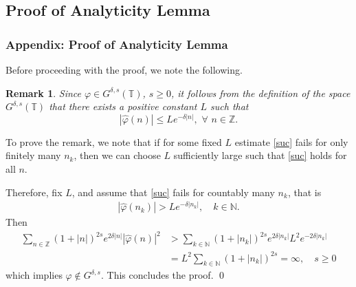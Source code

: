 \documentclass{beamer}
\numberwithin{equation}{section}
\newcommand{\vp}{\varphi}
\newtheorem{remark}{Remark}
\begin{document}
\subsection{Proof of Analyticity Lemma} 
\label{ssec:anal-strip}
\begin{frame}
  \frametitle{Appendix: Proof of Analyticity Lemma}
%
%
  Before proceeding with the proof, we note the following.
  \begin{remark}
Since $\varphi \in G^{\delta,s}(\mathbb{T})$, $s \ge 0$, it follows from the definition of the space $G^{\delta,s}(\mathbb{T})$ that there exists a positive
constant $L$ such that 
\begin{equation}
  \label{suc}
|\hat{\varphi}(n)|\le Le^{-\delta |n|},\,\,\forall\,\,n\in \mathbb{Z}.
\end{equation} 
\end{remark}
To prove the remark, we note that if for some fixed $L$ estimate \eqref{suc} fails
for only finitely many $n_{k}$, then we can choose $L$ sufficiently large such
that \eqref{suc} holds for all $n$. 
\end{frame}
\begin{frame}
  Therefore, fix $L$, and assume that \eqref{suc} fails
for countably many $n_{k}$, that is
%
%
\begin{equation*}
\begin{split}
  |\hat{\varphi}(n_{k})| > Le^{-\delta |n_{k}|}, \quad k \in \mathbb{N}.
\end{split}
\end{equation*}
%
%
%
Then
\begin{equation*}
\begin{split}
 \sum_{n\in \mathbb{Z}} 
 (1+ |n|)^{2s}e^{2\delta|n|}|\widehat{\vp}(n)|^2
 & > \sum_{k \in \mathbb{N}} 
(1+ |n_{k}|)^{2s}e^{2\delta|n_{k}|}L^{2}e^{-2\delta | n_{k} |}
 \\
 & = L^{2} \sum_{k \in \mathbb{N}} (1 + | n_{k} |)^{2s} = \infty, \quad s \ge 0
 \end{split}
\end{equation*}
%
%
which implies $\vp \not \in G^{\delta, s}$. This concludes the proof. \qed
\end{frame}
\end{document}
